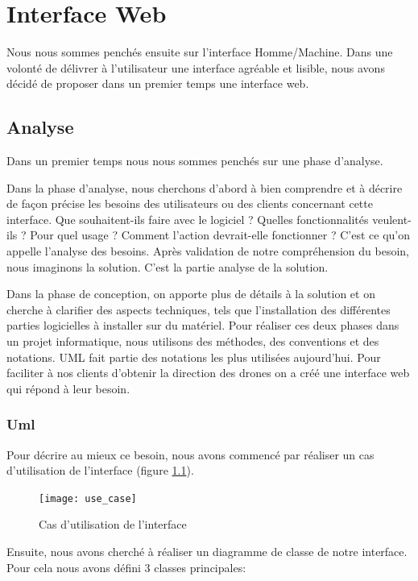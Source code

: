 
\chapter{Interface Web}
\label{Logiciel}

Nous nous sommes penchés ensuite sur l'interface Homme/Machine. Dans une volonté de délivrer à l'utilisateur une interface agréable et lisible, nous avons décidé de proposer dans un premier temps une interface web.

\section{Analyse}
\label{sec:uml}

Dans un premier temps nous nous sommes penchés sur une  phase d'analyse.

Dans la phase d’analyse, nous cherchons d’abord à bien comprendre et à décrire de façon précise les besoins des utilisateurs ou des clients concernant cette interface. Que souhaitent-ils faire avec le logiciel ? Quelles fonctionnalités veulent-ils ? Pour quel usage ? Comment l’action devrait-elle fonctionner ? C’est ce qu’on appelle \og l’analyse des besoins\fg{}. Après validation de notre compréhension du besoin, nous imaginons la solution. C’est la partie analyse de la solution.

Dans la phase de conception, on apporte plus de détails à la solution et on cherche à clarifier des aspects techniques, tels que l’installation des différentes parties logicielles à installer sur du matériel. Pour réaliser ces deux phases dans un projet informatique, nous utilisons des méthodes, des conventions et des notations. UML fait partie des notations les plus utilisées aujourd’hui. Pour faciliter à nos clients d’obtenir la direction des drones on a créé une interface web qui répond à leur besoin.

\subsection{Uml}

Pour décrire au mieux ce besoin, nous avons commencé par réaliser un cas d'utilisation de l'interface (figure \ref{fig:use_case}).
\begin{figure}[!h]
  \centering
  \texttt{[image: use\_case]}
  \caption{Cas d'utilisation de l'interface}
  \label{fig:use_case}
\end{figure}

\newpage
Ensuite, nous avons cherché à réaliser un diagramme de classe de notre interface. Pour cela nous avons défini 3 classes principales:

